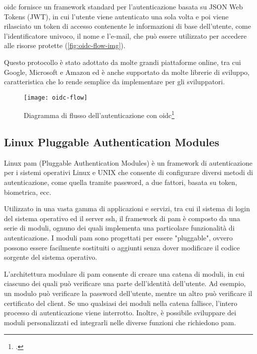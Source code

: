 \acrshort{oidc} fornisce un framework standard per l'autenticazione basata su JSON Web Tokens (JWT), in cui l'utente viene autenticato una sola volta e poi viene rilasciato un token di accesso contenente le informazioni di base dell'utente, come l'identificatore univoco, il nome e l'e-mail, che può essere utilizzato per accedere alle risorse protette (\autoref{fig:oidc-flow-img}).

Questo protocollo è stato adottato da molte grandi piattaforme online, tra cui Google, Microsoft e Amazon ed è anche supportato da molte librerie di sviluppo, caratteristica che lo rende semplice da implementare per gli sviluppatori.

\begin{figure}[!h] 
    \centering 
    \texttt{[image: oidc-flow]} 
    \caption{Diagramma di flusso dell'autenticazione con \acrshort{oidc}\footcite{site:oidc-flow-img}}
    \label{fig:oidc-flow-img}
\end{figure}

\subsection{Linux Pluggable Authentication Modules}
Linux \acrshort{pam} (Pluggable Authentication Modules) è un framework di autenticazione per i sistemi operativi Linux e UNIX che consente di configurare diversi metodi di autenticazione, come quella tramite password, a due fattori, basata su token, biometrica, ecc.

Utilizzato in una vasta gamma di applicazioni e servizi, tra cui il sistema di login del sistema operativo ed il server \acrshort{ssh}, il framework di \acrshort{pam} è composto da una serie di moduli, ognuno dei quali implementa una particolare funzionalità di autenticazione. I moduli \acrshort{pam} sono progettati per essere "pluggable", ovvero possono essere facilmente sostituiti o aggiunti senza dover modificare il codice sorgente del sistema operativo.

L'architettura modulare di \acrshort{pam} consente di creare una catena di moduli, in cui ciascuno dei quali può verificare una parte dell'identità dell'utente. Ad esempio, un modulo può verificare la password dell'utente, mentre un altro può verificare il certificato del client. Se uno qualsiasi dei moduli nella catena fallisce, l'intero processo di autenticazione viene interrotto. Inoltre, è possibile sviluppare dei moduli personalizzati ed integrarli nelle diverse funzioni che richiedono \acrshort{pam}.

